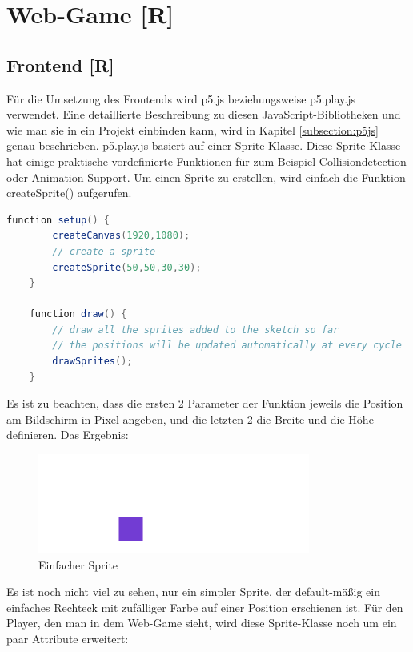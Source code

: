 \section{Web-Game [R]}
\subsection{Frontend [R]}
Für die Umsetzung des Frontends wird p5.js beziehungsweise p5.play.js verwendet. 
Eine detaillierte Beschreibung zu diesen JavaScript-Bibliotheken und wie man sie in ein Projekt einbinden kann, wird in Kapitel \ref{subsection:p5js} genau beschrieben.
p5.play.js basiert auf einer Sprite Klasse. Diese Sprite-Klasse hat einige praktische vordefinierte Funktionen für zum Beispiel Collisiondetection oder Animation Support. 
Um einen Sprite zu erstellen, wird einfach die Funktion createSprite() aufgerufen.
\\
\begin{lstlisting}[language=Java,label=lst:impl:createSprite]
    function setup() {
        createCanvas(1920,1080);
        // create a sprite
        createSprite(50,50,30,30);
    }

    function draw() {
        // draw all the sprites added to the sketch so far
        // the positions will be updated automatically at every cycle
        drawSprites();
    }
\end{lstlisting}


Es ist zu beachten, dass die ersten 2 Parameter der Funktion jeweils die Position am Bildschirm in Pixel angeben, und die letzten 2 die Breite und die Höhe definieren.
Das Ergebnis:
\begin{figure}[H]
    \centering
    \includegraphics[scale=1]{pics/simpleSprite.PNG}
    \caption{Einfacher Sprite}
\end{figure}

Es ist noch nicht viel zu sehen, nur ein simpler Sprite, der default-mäßig ein einfaches Rechteck mit zufälliger Farbe auf einer Position erschienen ist.
Für den Player, den man in dem Web-Game sieht, wird diese Sprite-Klasse noch um ein paar Attribute erweitert:

